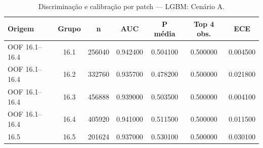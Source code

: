 \begin{table}[htbp]
\caption{Discriminação e calibração por patch — LGBM: Cenário A.}
\label{tab:erros_patch}
\centering
\small
\begin{tabular}{lcccccc}
\toprule
Origem & Grupo & n & AUC & P média & Top 4 obs. & ECE \\
\midrule
OOF 16.1–16.4 & 16.1 & 256040 & 0.942400 & 0.504100 & 0.500000 & 0.004500 \\
OOF 16.1–16.4 & 16.2 & 332760 & 0.935700 & 0.478200 & 0.500000 & 0.021800 \\
OOF 16.1–16.4 & 16.3 & 456888 & 0.939000 & 0.503500 & 0.500000 & 0.004100 \\
OOF 16.1–16.4 & 16.4 & 405920 & 0.941000 & 0.511500 & 0.500000 & 0.011500 \\
16.5 & 16.5 & 201624 & 0.937000 & 0.530100 & 0.500000 & 0.030100 \\
\bottomrule
\end{tabular}
\end{table}
